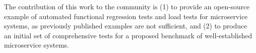 The contribution of this work to the community is (1) to provide an open-source example of automated functional regression tests and load tests for microservice systems, as previously published examples are not sufficient, and (2) to produce an initial set of comprehensive tests for a proposed benchmark of well-established microservice systems.%

    
    
    


